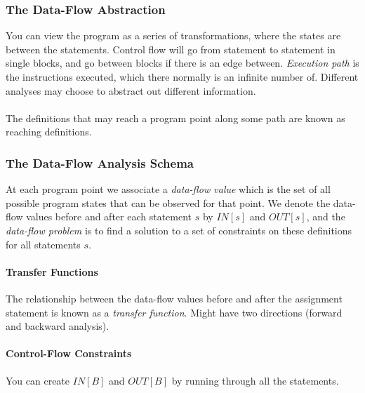 \documentclass{article}
\begin{document}
\subsubsection{The Data-Flow Abstraction} %
\label{ssub:The Data-Flow Abstraction}
You can view the program as a series of transformations, where the states are between the statements. Control flow will go from statement to statement in single blocks, and go between blocks if there is an edge between. \emph{Execution path} is the instructions executed, which there normally is an infinite number of. Different analyses may choose to abstract out different information.\\
\\
The definitions that may reach a program point along some path are known as reaching definitions.

\subsubsection{The Data-Flow Analysis Schema} %
\label{ssub:The Data-Flow Analysis Schema}
At each program point we associate a \emph{data-flow value} which is the set of all possible program states that can be observed for that point. We denote the data-flow values before and after each statement $s$ by $IN[s]$ and $OUT[s]$, and the \emph{data-flow problem} is to find a solution to a set of constraints on these definitions for all statements $s$.

\paragraph{Transfer Functions} %
\label{par:Transfer Functions}
The relationship between the data-flow values before and after the assignment statement is known as a \emph{transfer function}. Might have two directions (forward and backward analysis).

\paragraph{Control-Flow Constraints} %
\label{par:Control-Flow Constraints}
You can create $IN[B]$ and $OUT[B]$ by running through all the statements.

\end{document}
